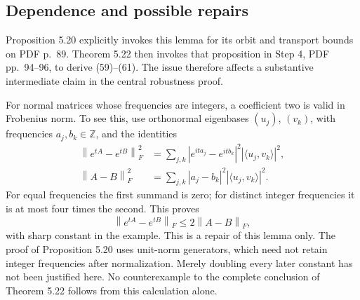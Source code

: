 \documentclass[10pt]{article}
\begin{document}
\subsection*{Dependence and possible repairs}
Proposition 5.20 explicitly invokes this lemma for its orbit and transport bounds on PDF p. 89. Theorem 5.22 then invokes that proposition in Step 4, PDF pp. 94–96, to derive (59)–(61). The issue therefore affects a substantive intermediate claim in the central robustness proof.\par
For normal matrices whose frequencies are integers, a coefficient two is valid in Frobenius norm. To see this, use orthonormal eigenbases \((u_j)\), \((v_k)\), with frequencies \(a_j,b_k\in\mathbb Z\), and the identities \[\begin{aligned}
 \left\lVert e^{tA}-e^{tB}\right\rVert_F^2
  &=\sum_{j,k}|e^{ita_j}-e^{itb_k}|^2|\langle u_j,v_k\rangle|^2,\\
 \left\lVert A-B\right\rVert_F^2
  &=\sum_{j,k}|a_j-b_k|^2|\langle u_j,v_k\rangle|^2.\end{aligned}\] For equal frequencies the first summand is zero; for distinct integer frequencies it is at most four times the second. This proves \[\left\lVert e^{tA}-e^{tB}\right\rVert_F\le2\left\lVert A-B\right\rVert_F,\] with sharp constant in the example. This is a repair of this lemma only. The proof of Proposition 5.20 uses unit-norm generators, which need not retain integer frequencies after normalization. Merely doubling every later constant has not been justified here. No counterexample to the complete conclusion of Theorem 5.22 follows from this calculation alone.\par
\end{document}
